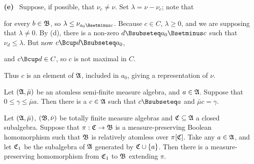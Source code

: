 {\medskip

{\bf (e)} \Quer\ Suppose, if possible, that $\nu_c\ne\nu$.
Set $\lambda=\nu-\nu_c$;  note that


\noindent for every $b\in\frak B$, so $\lambda\le\nu_{a_0\Bsetminus c}$.
Because $c\in C$, $\lambda\ge 0$, and we are supposing that $\lambda\ne 0$.
By (d), there is a non-zero $d\Bsubseteq a_0\Bsetminus c$ such that
$\nu_d\le\lambda$.   But now $c\Bcup d\Bsubseteq a_0$,


\noindent and $c\Bcup d\in C$, so $c$ is not maximal in $C$.\ \Bang

Thus $c$ is an element of $\frak A$, included in $a_0$,
giving a representation of $\nu$.
}%

 Let $(\frak A,\bar\mu)$ be an atomless
semi-finite measure algebra, and $a\in\frak A$.   Suppose that
$0\le\gamma\le\bar\mu a$.   Then there is a $c\in\frak A$ such that
$c\Bsubseteq a$ and $\bar\mu c=\gamma$.



 Let $(\frak A,\bar\mu)$, $(\frak B,\bar\nu)$ be
totally finite measure algebras and $\frak C\subseteq\frak A$ a closed
subalgebra.   Suppose that $\pi:\frak C\to\frak B$ is a
measure-preserving Boolean homomorphism such that $\frak B$ is
relatively atomless over $\pi[\frak C]$.
Take any $a\in\frak A$, and let $\frak C_1$ be the subalgebra
of $\frak A$ generated by $\frak C\cup\{a\}$.   Then  there is a
measure-preserving homomorphism from $\frak C_1$ to $\frak B$ extending
$\pi$.

